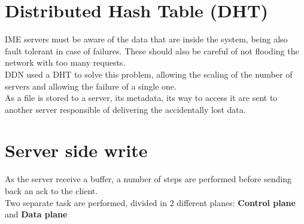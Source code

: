 
\section{Distributed Hash Table (DHT)}
IME servers must be aware of the data that are inside the system, being also
fault tolerant in case of failures. These should also be careful of not flooding
the network with too many requests. \\
DDN used a DHT to solve this problem, allowing the scaling of the number of
servers and allowing the failure of a single one. \\
As a file is stored to a server, its metadata, its way to access it are sent to
another server responsible of delivering the accidentally lost data.

\section{Server side write}
As the server receive a buffer, a number of steps are performed before sending
back an ack to the client. \\ Two separate task are performed, divided in 2
different planes: \textbf{Control plane} and \textbf{Data plane}

